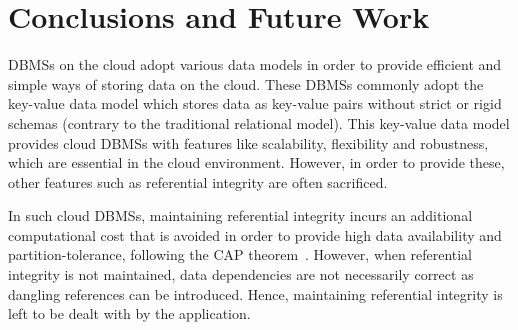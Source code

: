 \chapter{Conclusions and Future Work}

\acp{DBMS} on the cloud adopt various data models in order to provide  efficient
and simple ways of storing data on the cloud.
These \acp{DBMS} commonly adopt the key-value data model which stores data 
as key-value pairs without strict or rigid schemas (contrary to the traditional
relational model).
This key-value data model provides cloud \acp{DBMS} with features like
scalability, flexibility and robustness, which are essential in the
cloud environment.  However, in order to provide these, other features  such as
referential integrity  are often sacrificed.

In such cloud \acp{DBMS}, maintaining referential integrity incurs an additional
computational cost that is avoided in order to provide high data availability
and partition-tolerance, following the CAP theorem~\citep{Brewer,Stonebraker}.
However, when referential integrity is not maintained, data dependencies are not
necessarily correct as dangling references can be introduced. Hence, 
maintaining referential integrity is left to be dealt with by the application.


